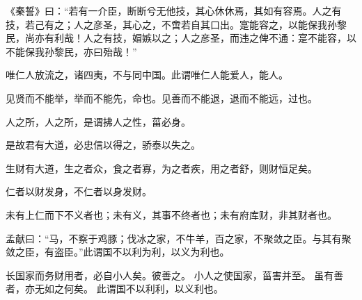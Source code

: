 \documentclass[twoside,openany]{book}
\begin{document}
\begin{pinyinscope}
《秦誓》曰：“若有一介臣，断断兮无他技，其心休休焉，其如有容焉。人之有技，若己有之；人之彦圣，其心之，不啻若自其口出。寔能容之，以能保我孙黎民，尚亦有利哉！人之有技，媢嫉以之；人之彦圣，而违之俾不通：寔不能容，以不能保我孙黎民，亦曰殆哉！”

唯仁人放流之，诸四夷，不与同中国。此谓唯仁人能爱人，能人。

见贤而不能举，举而不能先，命也。见善而不能退，退而不能远，过也。

人之所，人之所，是谓拂人之性，菑必身。

是故君有大道，必忠信以得之，骄泰以失之。

生财有大道，生之者众，食之者寡，为之者疾，用之者舒，则财恒足矣。

仁者以财发身，不仁者以身发财。

未有上仁而下不义者也；未有义，其事不终者也；未有府库财，非其财者也。

孟献曰：“马，不察于鸡豚；伐冰之家，不牛羊，百之家，不聚敛之臣。与其有聚敛之臣，有盗臣。”此谓国不以利为利，以义为利也。

长国家而务财用者，必自小人矣。彼善之。
小人之使国家，菑害并至。
虽有善者，亦无如之何矣。
此谓国不以利利，以义利也。
\end{pinyinscope}
\end{document}
